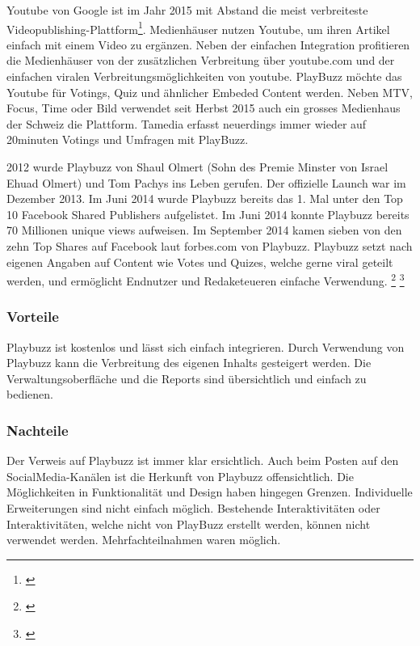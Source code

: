 Youtube von Google ist im Jahr 2015 mit Abstand die meist verbreiteste
Videopublishing-Plattform\footnote{\autocite{statista}}. Medienhäuser
nutzen Youtube, um ihren Artikel einfach mit einem Video zu ergänzen.
Neben der einfachen Integration profitieren die Medienhäuser von der
zusätzlichen Verbreitung über youtube.com und der einfachen viralen
Verbreitungsmöglichkeiten von youtube. PlayBuzz möchte das Youtube für
Votings, Quiz und ähnlicher Embeded Content werden. Neben MTV, Focus,
Time oder Bild verwendet seit Herbst 2015 auch ein grosses Medienhaus
der Schweiz die Plattform. Tamedia erfasst neuerdings immer wieder auf
20minuten Votings und Umfragen mit PlayBuzz.

2012 wurde Playbuzz von Shaul Olmert (Sohn des Premie Minster von Israel
Ehuad Olmert) und Tom Pachys ins Leben gerufen. Der offizielle Launch
war im Dezember 2013. Im Juni 2014 wurde Playbuzz bereits das 1. Mal
unter den Top 10 Facebook Shared Publishers aufgelistet. Im Juni 2014
konnte Playbuzz bereits 70 Millionen unique views aufweisen. Im
September 2014 kamen sieben von den zehn Top Shares auf Facebook laut
forbes.com von Playbuzz. Playbuzz setzt nach eigenen Angaben auf Content
wie Votes und Quizes, welche gerne viral geteilt werden, und ermöglicht
Endnutzer und Redaketeueren einfache Verwendung. \footnote{\autocite{t3nplaybuzz}}
\footnote{\autocite{playbuzz}}

\subsubsection{Vorteile}\label{vorteile-1}

Playbuzz ist kostenlos und lässt sich einfach integrieren. Durch
Verwendung von Playbuzz kann die Verbreitung des eigenen Inhalts
gesteigert werden. Die Verwaltungsoberfläche und die Reports sind
übersichtlich und einfach zu bedienen.

\subsubsection{Nachteile}\label{nachteile-1}

Der Verweis auf Playbuzz ist immer klar ersichtlich. Auch beim Posten
auf den SocialMedia-Kanälen ist die Herkunft von Playbuzz
offensichtlich. Die Möglichkeiten in Funktionalität und Design haben
hingegen Grenzen. Individuelle Erweiterungen sind nicht einfach möglich.
Bestehende Interaktivitäten oder Interaktivitäten, welche nicht von
PlayBuzz erstellt werden, können nicht verwendet werden.
Mehrfachteilnahmen waren möglich.

